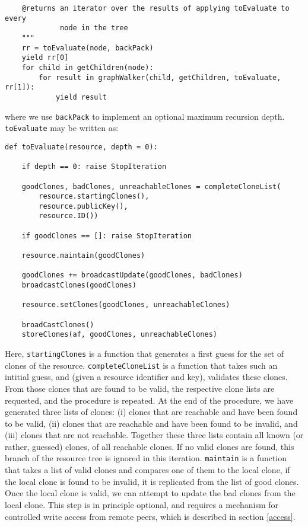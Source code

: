 \documentclass[11pt]{article}
\begin{document}
\begin{mainmatter}
\begin{verbatim}
    @returns an iterator over the results of applying toEvaluate to every 
             node in the tree
    """
    rr = toEvaluate(node, backPack)
    yield rr[0]
    for child in getChildren(node):
        for result in graphWalker(child, getChildren, toEvaluate, rr[1]):
            yield result
\end{verbatim}
where we use \texttt{backPack} to implement an optional maximum recursion depth. \texttt{toEvaluate} may be written as:
\begin{verbatim}
def toEvaluate(resource, depth = 0):

    if depth == 0: raise StopIteration
    
    goodClones, badClones, unreachableClones = completeCloneList(
        resource.startingClones(), 
        resource.publicKey(), 
        resource.ID())
    
    if goodClones == []: raise StopIteration

    resource.maintain(goodClones)
   
    goodClones += broadcastUpdate(goodClones, badClones)
    broadcastClones(goodClones)
    
    resource.setClones(goodClones, unreachableClones)

    broadCastClones()
    storeClones(af, goodClones, unreachableClones)
\end{verbatim}
Here, \texttt{startingClones} is a function that generates a first guess for the set of clones of the resource. \texttt{completeCloneList} is a function that takes such an intitial guess, and (given a resource identifier and key), validates these clones. From those clones that are found to be valid, the respective clone lists are requested, and the procedure is repeated. At the end of the procedure, we have generated three lists of clones: (i) clones that are reachable and have been found to be valid, (ii) clones that are reachable and have been found to be invalid, and (iii) clones that are not reachable. Together these three lists contain all known (or rather, guessed) clones, of all reachable clones. If no valid clones are found, this branch of the resource tree is ignored in this iteration. \texttt{maintain} is a function that takes a list of valid clones and compares one of them to the local clone, if the local clone is found to be invalid, it is replicated from the list of good clones. Once the local clone is valid, we can attempt to update the bad clones from the local clone. This step is in principle optional, and requires a mechanism for controlled write access from remote peers, which is described in section \ref{access}. 

\end{mainmatter}
\end{document}
